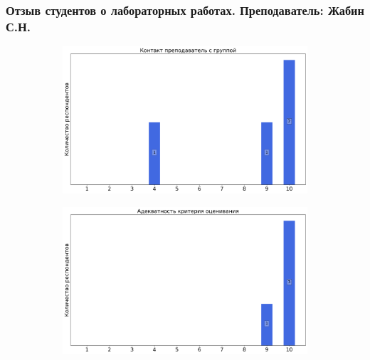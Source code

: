         \subsubsection{Отзыв студентов о лабораторных работах. Преподаватель: Жабин С.Н.}
            \begin{figure}[H]
                \centering
                \begin{subfigure}[b]{0.45\textwidth}
                    \centering
                    \includegraphics[width=\textwidth]{images/3 course/Общая физика - квантовая физика/labniks-marks-Жабин С.Н.-0.png}
                \end{subfigure}
                \begin{subfigure}[b]{0.45\textwidth}
                    \centering
                    \includegraphics[width=\textwidth]{images/3 course/Общая физика - квантовая физика/labniks-marks-Жабин С.Н.-1.png}
                \end{subfigure}
                \begin{subfigure}[b]{0.45\textwidth}

\end{subfigure}
\end{figure}

